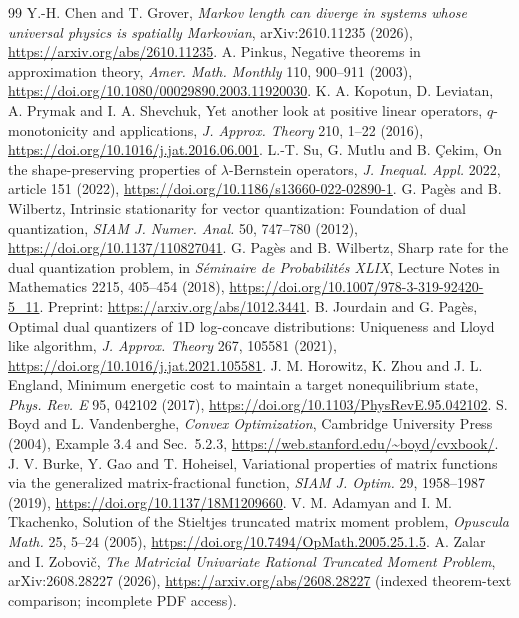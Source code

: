 \documentclass[11pt]{article}
\begin{document}
\begin{thebibliography}{99}
 Y.-H. Chen and T. Grover, \emph{Markov length can diverge in systems whose universal physics is spatially Markovian}, arXiv:2610.11235 (2026), \url{https://arxiv.org/abs/2610.11235}.
 A. Pinkus, Negative theorems in approximation theory, \emph{Amer. Math. Monthly} 110, 900--911 (2003), \url{https://doi.org/10.1080/00029890.2003.11920030}.
 K. A. Kopotun, D. Leviatan, A. Prymak and I. A. Shevchuk, Yet another look at positive linear operators, $q$-monotonicity and applications, \emph{J. Approx. Theory} 210, 1--22 (2016), \url{https://doi.org/10.1016/j.jat.2016.06.001}.
 L.-T. Su, G. Mutlu and B. \c{C}ekim, On the shape-preserving properties of $\lambda$-Bernstein operators, \emph{J. Inequal. Appl.} 2022, article 151 (2022), \url{https://doi.org/10.1186/s13660-022-02890-1}.
 G. Pag\`es and B. Wilbertz, Intrinsic stationarity for vector quantization: Foundation of dual quantization, \emph{SIAM J. Numer. Anal.} 50, 747--780 (2012), \url{https://doi.org/10.1137/110827041}.
 G. Pag\`es and B. Wilbertz, Sharp rate for the dual quantization problem, in \emph{S\'eminaire de Probabilit\'es XLIX}, Lecture Notes in Mathematics 2215, 405--454 (2018), \url{https://doi.org/10.1007/978-3-319-92420-5_11}. Preprint: \url{https://arxiv.org/abs/1012.3441}.
 B. Jourdain and G. Pag\`es, Optimal dual quantizers of 1D log-concave distributions: Uniqueness and Lloyd like algorithm, \emph{J. Approx. Theory} 267, 105581 (2021), \url{https://doi.org/10.1016/j.jat.2021.105581}.
 J. M. Horowitz, K. Zhou and J. L. England, Minimum energetic cost to maintain a target nonequilibrium state, \emph{Phys. Rev. E} 95, 042102 (2017), \url{https://doi.org/10.1103/PhysRevE.95.042102}.
 S. Boyd and L. Vandenberghe, \emph{Convex Optimization}, Cambridge University Press (2004), Example 3.4 and Sec.~5.2.3, \url{https://web.stanford.edu/~boyd/cvxbook/}.
 J. V. Burke, Y. Gao and T. Hoheisel, Variational properties of matrix functions via the generalized matrix-fractional function, \emph{SIAM J. Optim.} 29, 1958--1987 (2019), \url{https://doi.org/10.1137/18M1209660}.
 V. M. Adamyan and I. M. Tkachenko, Solution of the Stieltjes truncated matrix moment problem, \emph{Opuscula Math.} 25, 5--24 (2005), \url{https://doi.org/10.7494/OpMath.2005.25.1.5}.
 A. Zalar and I. Zobovi\v{c}, \emph{The Matricial Univariate Rational Truncated Moment Problem}, arXiv:2608.28227 (2026), \url{https://arxiv.org/abs/2608.28227} (indexed theorem-text comparison; incomplete PDF access).
\end{thebibliography}
\end{document}
